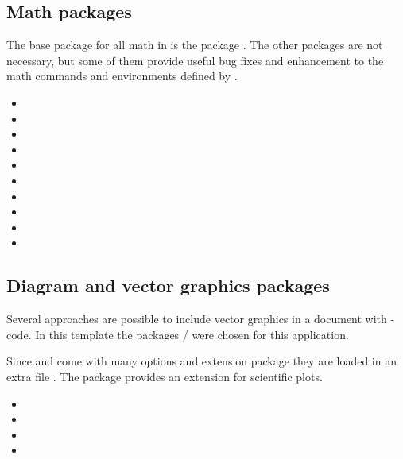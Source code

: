 \subsection{Math packages}
\label{sec:packages:math}

The base package for all math in \latex is the package . The other packages are not necessary, but some of them provide useful bug fixes and enhancement to the math commands and environments defined by .

\begin{itemize}[noitemsep]
\item {}
\item {}
\item {}
\item {}
\item {}
\item {}
\item {}
\item {}
\item {}
\item {}
\end{itemize}



\subsection{Diagram and vector graphics packages}
\label{sec:packages:pgf}

Several approaches are possible to include vector graphics in a \latex document with \latex-code. In this template the packages / were chosen for this application.

Since  and  come with many options and 
extension package they are loaded in an extra file 
. The package  
provides an extension for scientific plots.

\begin{itemize}[noitemsep]
\item {}
\item {}
\item {}
\item {}
\end{itemize}

